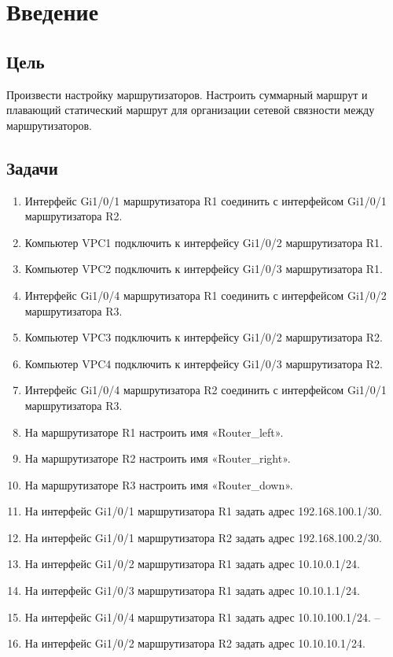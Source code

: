 \chapter{Введение}

\section{Цель}  

Произвести настройку маршрутизаторов. Настроить
суммарный маршрут и плавающий статический маршрут для организации сетевой
связности между маршрутизаторов.
\section{Задачи}

\begin{enumerate}
\item Интерфейс Gi1/0/1 маршрутизатора R1 соединить с интерфейсом Gi1/0/1
маршрутизатора R2.
\item Компьютер VPC1 подключить к интерфейсу Gi1/0/2 маршрутизатора R1.
\item Компьютер VPC2 подключить к интерфейсу Gi1/0/3 маршрутизатора R1.
\item Интерфейс Gi1/0/4 маршрутизатора R1 соединить с интерфейсом Gi1/0/2
маршрутизатора R3.
\item Компьютер VPC3 подключить к интерфейсу Gi1/0/2 маршрутизатора R2.
\item Компьютер VPC4 подключить к интерфейсу Gi1/0/3 маршрутизатора R2.
\item Интерфейс Gi1/0/4 маршрутизатора R2 соединить с интерфейсом Gi1/0/1
маршрутизатора R3.
\item На маршрутизаторе R1 настроить имя «Router_left».
\item На маршрутизаторе R2 настроить имя «Router_right».
\item На маршрутизаторе R3 настроить имя «Router_down».
\item На интерфейс Gi1/0/1 маршрутизатора R1 задать адрес 192.168.100.1/30.
\item На интерфейс Gi1/0/1 маршрутизатора R2 задать адрес 192.168.100.2/30.
\item На интерфейс Gi1/0/2 маршрутизатора R1 задать адрес 10.10.0.1/24.
\item На интерфейс Gi1/0/3 маршрутизатора R1 задать адрес 10.10.1.1/24.
\item На интерфейс Gi1/0/4 маршрутизатора R1 задать адрес 10.10.100.1/24.
–\item На интерфейс Gi1/0/2 маршрутизатора R2 задать адрес 10.10.10.1/24.

\end{enumerate}
